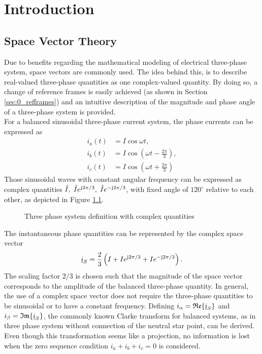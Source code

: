 \chapter{Introduction}\label{ch:introduction}
\section{Space Vector Theory} \label{sec:0_sv} 
Due to benefits regarding the mathematical modeling of electrical three-phase system, space vectors are commonly used. The idea behind this, is to describe real-valued three-phase quantities as one complex-valued quantity. By doing so, a change of reference frames is easily achieved (as shown in Section \ref{sec:0_refframes})  and  an intuitive description of the magnitude and phase angle of a three-phase system is provided. \\
For a balanced sinusoidal three-phase current system, the phase currents can be expressed as 
\begin{equation*}
	\begin{split}
		i_a(t) &= I\cos\omega t,\\
		i_b(t) &= I\cos\left(\omega t-\frac{2\pi}{3}\right),\\
		i_c(t) &= I\cos\left(\omega t+\frac{2\pi}{3}\right)
	\end{split}
	\label{equ:0_current_sequence}
\end{equation*}
Those sinusoidal waves with constant angular frequency can be expressed as complex quantities $ \hat{I},\; \hat{I} e^{\mathrm{j} 2\pi/3},\; \hat{I} e^{-\mathrm{j} 2\pi/3}$, with fixed angle of $120^\circ$ relative to each other, as depicted in Figure \ref{fig:0_sv}.
\begin{figure}
	\centering
	
	\caption{Three phase system definition with complex quantities}
	\label{fig:0_sv}
\end{figure}
The instantaneous phase quantities can be represented by the complex space vector
\[
\underline{i}_{S} = \frac{2}{3} \left( {I} + {I} e^{\mathrm{j} 2\pi/3} + {I} e^{-\mathrm{j} 2\pi/3}  \right).
\]
The scaling factor $2/3$ is chosen such that the magnitude of the space vector corresponds to the amplitude of the balanced three-phase quantity. In general, the use of a complex space vector does not require the three-phase quantities to be sinusoidal or to have a constant frequency. Defining $i_\alpha = \mathfrak{Re}\{\underline{i}_{S}\}$ and $i_\beta = \mathfrak{Im}\{\underline{i}_{S}\}$, the commonly known Clarke transform for balanced systems, as in three phase system without connection of the neutral star point, can be derived. \\
Even though this transformation seems like a projection, no information is lost when the zero sequence condition $i_a + i_b + i_c = 0$ is considered.


